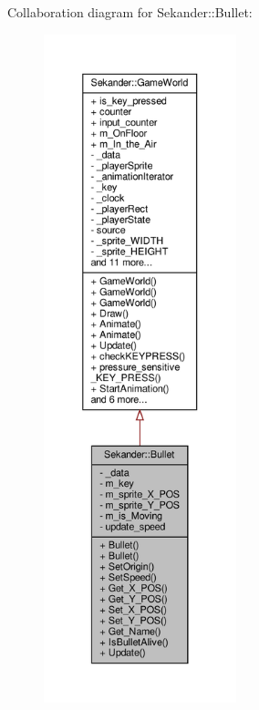 Collaboration diagram for Sekander\+:\+:Bullet\+:
\nopagebreak
\begin{figure}[H]
\begin{center}
\leavevmode
\includegraphics[height=550pt]{classSekander_1_1Bullet__coll__graph}
\end{center}
\end{figure}
